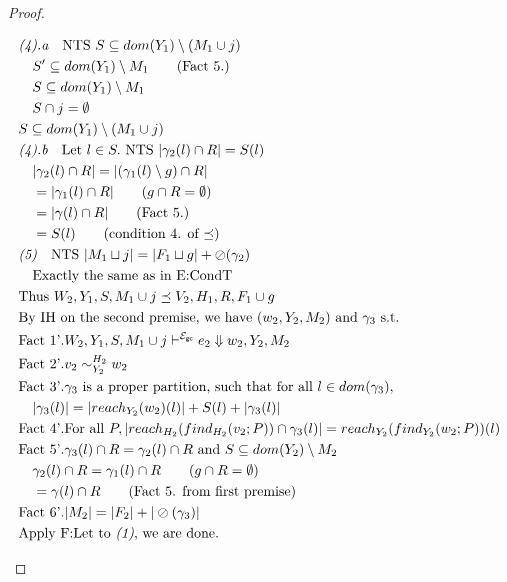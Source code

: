 \documentclass{easychair}
\newcommand{\ms}[1]{\ensuremath{\mathsf{#1}}}
\newcommand{\veq}[4]{#3 \sim^{#1}_{#2} #4}
\newcommand{\oh}[1]{\oslash(#1)}
\newcommand{\gcSem}{\ensuremath{\mathcal{E}_{\ms{gc}}}}
\theoremstyle{definition}
\begin{document}
\begin{proof}
\begin{description}
\begin{align*}
		&\emph{(4).a}\quad \text{NTS } S \subseteq dom(Y_1) \setminus (M_1 \cup j)\\
		&\quad S' \subseteq dom(Y_1) \setminus M_1 \tag{Fact 5.}\\
		&\quad S \subseteq dom(Y_1) \setminus M_1\\
		&\quad S \cap j = \emptyset\\
		&S \subseteq dom(Y_1) \setminus (M_1 \cup j)\\
		&\emph{(4).b}\quad \text{Let } l \in S. \text{ NTS } |\gamma_2(l) \cap R| = S(l)\\
		&\quad |\gamma_2(l) \cap R| = |(\gamma_1(l) \setminus g) \cap R| \\
		&\quad = |\gamma_1(l) \cap R| \tag{$g \cap R = \emptyset$}\\
		&\quad = |\gamma(l) \cap R| \tag{Fact 5.}\\
		&\quad = S(l) \tag{condition 4. of $\preceq$}\\ 
		&\emph{(5)}\quad \text{NTS } |M_1 \sqcup j| = |F_1 \sqcup g| + \oh{\gamma_2}\\
		&\quad\text{Exactly the same as in E:CondT}\\
		&\text{Thus } W_2,Y_1,S,M_1 \cup j \preceq V_2,H_1,R, F_1 \cup g\\
		&\text{By IH on the second premise, we have } (w_2,Y_2,M_2) \text{ and } \gamma_3 \text{ s.t. }\\
		&\text{Fact 1'}. W_2,Y_1,S,M_1 \cup j \vdash^{\gcSem} e_2 \Downarrow w_2,Y_2,M_2\\
		&\text{Fact 2'}. \veq{H_2}{Y_2}{v_2}{w_2}\\
		&\text{Fact 3'}. \gamma_3 \text{ is a proper partition, such that for all } l \in dom(\gamma_3),\\
		&\quad|\gamma_3(l)| = |reach_{Y_2}(w_2)(l)| + S(l) + |\gamma_3(l)|\\
		&\text{Fact 4'}. \text{For all } P, |reach_{H_2}(find_{H_2}(v_2;P)) \cap \gamma_3(l)| = 
				reach_{Y_2}(find_{Y_2}(w_2;P))(l)\\
		&\text{Fact 5'}. \gamma_3(l) \cap R = \gamma_2(l) \cap R \text{ and } 
			S \subseteq dom(Y_2) \setminus M_2\\
		&\quad \gamma_2(l) \cap R = \gamma_1(l) \cap R \tag{$g \cap R = \emptyset$}\\
		&\quad = \gamma(l) \cap R \tag{Fact 5. from first premise}\\
		&\text{Fact 6'}. |M_2| = |F_2| + |\oh{\gamma_3}|\\
		&\text{Apply F:Let to \emph{(1)}, we are done.}
  \end{align*}

\end{description}
\end{proof}
\end{document}
